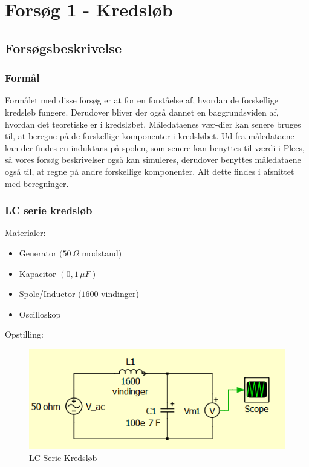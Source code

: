 \section{Forsøg 1 - Kredsløb}

\subsection{Forsøgsbeskrivelse}

\subsubsection{Formål}
Formålet med disse forsøg er at for en forståelse af, hvordan de forskellige kredsløb fungere. Derudover bliver der også dannet en baggrundsviden af, hvordan det teoretiske er i kredsløbet. Måledataenes vær-dier kan senere bruges til, at beregne på de forskellige komponenter i kredsløbet. Ud fra måledataene kan der findes en induktans på spolen, som senere kan benyttes til værdi i Plecs, så vores forsøg beskrivelser også kan simuleres, derudover benyttes måledataene også til, at regne på andre forskellige komponenter. Alt dette findes i afsnittet med beregninger.

\subsubsection{LC serie kredsløb}

Materialer:

\begin{itemize}
\item Generator $(50\, \Omega$ modstand)
\item Kapacitor $( 0,1\, \mu F)$
\item Spole/Inductor $(1600$ vindinger)
\item Oscilloskop
\end{itemize}

Opstilling:

\begin{figure}[H]
\centering
\includegraphics[scale=1]{Vildledning/Schematics/Kredslb/LC_Serie}
\caption{LC Serie Kredsløb}
\label{lcserie}
\end{figure}

